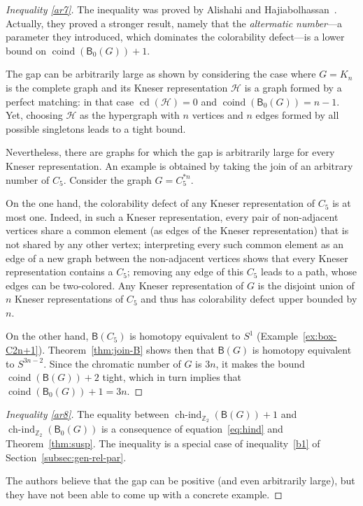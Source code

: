 \documentclass[12pt]{amsart}
\theoremstyle{definition}
\def\Z{\mathbb{Z}}
\def\HH{\mathcal{H}}
\def\B{\mathsf{B}}
\def\coind{\operatorname{coind}}
\def\hind{\operatorname{ch-ind}_{\Z_2}}
\def\cd{\operatorname{cd}}
\begin{document}
\begin{proof}[Inequality \eqref{ar7}]
The inequality was proved by Alishahi and Hajiabolhassan~\cite[Theorem 1]{Alishahi2018AGO}. Actually, they proved a stronger result, namely that the {\em altermatic number}---a parameter they introduced, which dominates the colorability defect---is a lower bound on $\coind(\B_0(G))+1$.

The gap can be arbitrarily large as shown by considering the case where $G=K_n$ is the complete graph and its Kneser representation $\HH$ is a graph formed by a perfect matching: in that case $\cd(\HH)=0$ and $\coind(\B_0(G))=n-1$. Yet, choosing $\HH$ as the hypergraph with $n$ vertices and $n$ edges formed by all possible singletons leads to a tight bound. 

Nevertheless, there are graphs for which the gap is arbitrarily large for every Kneser representation. An example is obtained by taking the join of an arbitrary number of $C_5$. Consider the graph $G=C_5^{*n}$.

On the one hand, the colorability defect of any Kneser representation of $C_5$ is at most one. Indeed, in such a Kneser representation, every pair of non-adjacent vertices share a common element (as edges of the Kneser representation) that is not shared by any other vertex; interpreting every such common element as an edge of a new graph between the non-adjacent vertices shows that every Kneser representation contains a $C_5$; removing any edge of this $C_5$ leads to a path, whose edges can be two-colored. Any Kneser representation of $G$ is the disjoint union of $n$ Kneser representations of $C_5$ and thus has colorability defect upper bounded by $n$. 

On the other hand, $\B(C_5)$ is homotopy equivalent to $S^1$ (Example~\ref{ex:box-C2n+1}). Theorem~\ref{thm:join-B} shows then that $\B(G)$ is homotopy equivalent to $S^{3n-2}$. Since the chromatic number of $G$ is $3n$, it makes the bound $\coind(\B(G))+2$ tight, which in turn implies that $\coind(\B_0(G))+1=3n$.
\end{proof}

\begin{proof}[Inequality \eqref{ar8}]
The equality between $\hind(\B(G))+1$ and $\hind(\B_0(G))$ is a consequence of equation~\eqref{eq:hind} and Theorem~\ref{thm:susp}. The inequality is a special case of inequality~\eqref{b1} of Section~\ref{subsec:gen-rel-par}.

The authors believe that the gap can be positive (and even arbitrarily large), but they have not been able to come up with a concrete example.
\end{proof}
\end{document}
